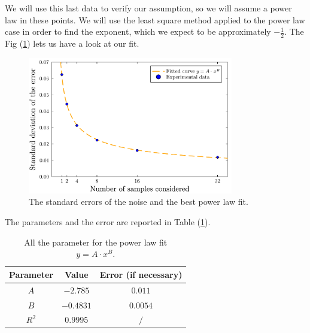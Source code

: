 \documentclass[a4paper,12pt]{article}
\begin{document}
\par We will use this last data to verify our assumption, so we will assume a power law
in these points. We will use the least square method applied to the power law case 
in order to find the exponent, which we expect to be approximately $- \frac{1}{2}$.
The Fig (\ref{plot:error_fit}) lets us have a look at our fit.
\begin{figure}[H]
    \centering
    \includegraphics[width=0.8\textwidth]{Std_error.pdf}
    \caption{The standard errors of the noise and the best power law fit.}
    \label{plot:error_fit}
\end{figure}

\par The parameters and the error are reported in Table (\ref{tab:powerlaw_results}).

\begin{table}[h]
    \centering
    \begin{tabular}{|c|c|c|}
        \hline
        Parameter & Value & Error (if necessary) \\
        \hline
        $A$ & $-2.785$ & $0.011$ \\
        $B$ & $-0.4831$ & $0.0054$ \\
        $R^2$ & $0.9995$ & $/$ \\
        \hline
    \end{tabular}
    \caption{All the parameter for the power law fit $y=A \cdot x^B$.}
    \label{tab:powerlaw_results}
\end{table}
\end{document}
